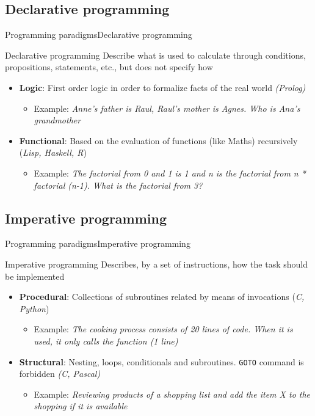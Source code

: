 \documentclass[10pt,compress]{beamer} %
\begin{document}
\subsection{Declarative programming}
\begin{frame}{Programming paradigms}{Declarative programming}
	\begin{block}{Declarative programming}
Describe \alert{what} is used to calculate through conditions, propositions, statements, etc., but does not specify how
  	\end{block}
  	\begin{itemize}
  		\item \textbf{Logic}: First order logic in order to formalize facts of the real world \textit{(Prolog)}
  		\begin{itemize}
  			\item Example: \textit{Anne's father is Raul, Raul's mother is Agnes. Who is Ana's grandmother} 
  		\end{itemize}
  		\item \textbf{Functional}: Based on the evaluation of functions (like Maths) recursively  (\textit{Lisp, Haskell, R})
  		\begin{itemize}
  			\item Example: \textit{The factorial from 0 and 1 is 1 and n is the factorial from n * factorial (n-1). What is the factorial from 3?} 
  		\end{itemize}
  	\end{itemize}
\end{frame}

\subsection{Imperative programming}

\begin{frame}{Programming paradigms}{Imperative programming}
	\begin{block}{Imperative programming}
		Describes, by a set of instructions, \alert{how} the task should be implemented  
  	\end{block}
  	\begin{itemize}
  		\item \textbf{Procedural}: Collections of subroutines related by means of invocations (\textit{C, Python})
  		\begin{itemize}
  			\item Example: \textit{The cooking process consists of 20 lines of code. When it is used, it only calls the function (1 line)} 
  		\end{itemize}
  		\item \textbf{Structural}: Nesting, loops, conditionals and subroutines. \texttt{GOTO} command is forbidden 				 \textit{(C, Pascal)}
  		\begin{itemize}
  			\item Example: \textit{Reviewing products of a shopping list and add the item X to the shopping if it is available} 
  		\end{itemize}
  	\end{itemize}
\end{frame}
\end{document}
